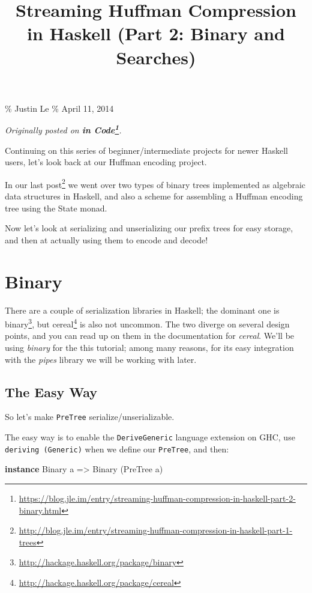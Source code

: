 \documentclass[]{article}
\title{Streaming Huffman Compression in Haskell (Part 2: Binary and Searches)}
\newenvironment{Shaded}{}{}
\newcommand{\DataTypeTok}[1]{\textcolor[rgb]{0.56,0.13,0.00}{#1}}
\newcommand{\KeywordTok}[1]{\textcolor[rgb]{0.00,0.44,0.13}{\textbf{#1}}}
\newcommand{\NormalTok}[1]{#1}
\newcommand{\OtherTok}[1]{\textcolor[rgb]{0.00,0.44,0.13}{#1}}
\renewcommand{\href}[2]{#2\footnote{\url{#1}}}
\begin{document}
\maketitle

\% Justin Le \% April 11, 2014

\emph{Originally posted on
\textbf{\href{https://blog.jle.im/entry/streaming-huffman-compression-in-haskell-part-2-binary.html}{in
Code}}.}

Continuing on this series of beginner/intermediate projects for newer Haskell
users, let's look back at our Huffman encoding project.

In our
\href{http://blog.jle.im/entry/streaming-huffman-compression-in-haskell-part-1-trees}{last
post} we went over two types of binary trees implemented as algebraic data
structures in Haskell, and also a scheme for assembling a Huffman encoding tree
using the State monad.

Now let's look at serializing and unserializing our prefix trees for easy
storage, and then at actually using them to encode and decode!

\section{Binary}\label{binary}

There are a couple of serialization libraries in Haskell; the dominant one is
\href{http://hackage.haskell.org/package/binary}{binary}, but
\href{http://hackage.haskell.org/package/cereal}{cereal} is also not uncommon.
The two diverge on several design points, and you can read up on them in the
documentation for \emph{cereal}. We'll be using \emph{binary} for the this
tutorial; among many reasons, for its easy integration with the \emph{pipes}
library we will be working with later.

\subsection{The Easy Way}\label{the-easy-way}

So let's make \texttt{PreTree} serialize/unserializable.

The easy way is to enable the \texttt{DeriveGeneric} language extension on GHC,
use \texttt{deriving\ (Generic)} when we define our \texttt{PreTree}, and then:

\begin{Shaded}
\begin{Highlighting}[]
\KeywordTok{instance} \DataTypeTok{Binary}\NormalTok{ a }\OtherTok{=\textgreater{}} \DataTypeTok{Binary}\NormalTok{ (}\DataTypeTok{PreTree}\NormalTok{ a)}
\end{Highlighting}
\end{Shaded}
\end{document}
